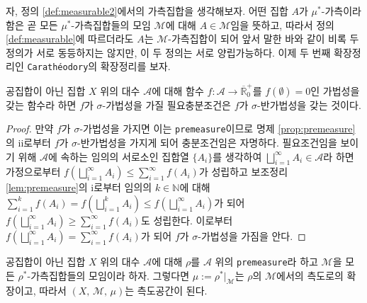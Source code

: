 자, 정의 \ref{def:measurable2}에서의 가측집합을 생각해보자. 어떤 집합 $A$가 $\mu^*$-가측이라 함은 곧 모든 $\mu^*$-가측집합들의 모임 $\mathcal{M}$에 대해 $A\in\mathcal{M}$임을 뜻하고, 따라서 정의 \ref{def:measurable}에 따르더라도 $A$는 $\mathcal{M}$-가측집합이 되어 앞서 말한 바와 같이 비록 두 정의가 서로 동등하지는 않지만, 이 두 정의는 서로 양립가능하다. 이제 두 번째 확장정리인 \texttt{Carath\'eodory}의 확장정리를 보자.

\begin{lemma}\label{lem:Caratheodory}
    공집합이 아닌 집합 $X$ 위의 대수 $\mathcal{A}$에 대해 함수 $f:\mathcal{A}\to\overline{\mathbb{R}}^+_0$를 $f(\emptyset)=0$인 가법성을 갖는 함수라 하면 $f$가 $\sigma$-가법성을 가질 필요충분조건은 $f$가 $\sigma$-반가법성을 갖는 것이다.
\end{lemma}

\begin{proof}
    만약 $f$가 $\sigma$-가법성을 가지면 이는 \texttt{premeasure}이므로 명제 \ref{prop:premeasure}의 ii로부터 $f$가 $\sigma$-반가법성을 가지게 되어 충분조건임은 자명하다. 필요조건임을 보이기 위해 $\mathcal{A}$에 속하는 임의의 서로소인 집합열 $\{A_i\}$를 생각하여 $\bigsqcup_{i=1}^\infty A_i\in\mathcal{A}$라 하면 가정으로부터 $f(\bigsqcup_{i=1}^\infty A_i)\leq\sum_{i=1}^\infty f(A_i)$가 성립하고 보조정리 \ref{lem:premeasure}의 i로부터 임의의 $k\in\mathbb{N}$에 대해 $\sum_{i=1}^kf(A_i)=f(\bigsqcup_{i=1}^kA_i)\leq f(\bigsqcup_{i=1}^\infty A_i)$가 되어 $f(\bigsqcup_{i=1}^\infty A_i)\geq\sum_{i=1}^\infty f(A_i)$도 성립한다. 이로부터 $f(\bigsqcup_{i=1}^\infty A_i)=\sum_{i=1}^\infty f(A_i)$가 되어 $f$가 $\sigma$-가법성을 가짐을 안다.
\end{proof}

\begin{theorem}
    공집합이 아닌 집합 $X$ 위의 대수 $\mathcal{A}$에 대해 $\rho$를 $\mathcal{A}$ 위의 \texttt{premeasure}라 하고 $\mathcal{M}$을 모든 $\rho^*$-가측집합들의 모임이라 하자. 그렇다면 $\mu:=\rho^*\vert_{\mathcal{M}}$는 $\rho$의 $\mathcal{M}$에서의 측도로의 확장이고, 따라서 $(X,\,\mathcal{M},\,\mu)$는 측도공간이 된다.
\end{theorem}

